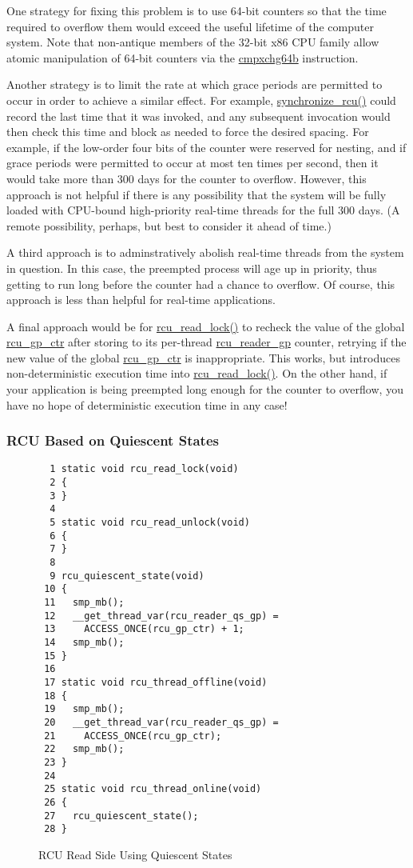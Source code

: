 {	One strategy for fixing this problem is to use 64-bit
	counters so that the time required to overflow them would exceed
	the useful lifetime of the computer system.
	Note that non-antique members of the 32-bit x86 CPU family
	allow atomic manipulation of 64-bit counters via the
	\url{cmpxchg64b} instruction.

	Another strategy is to limit the rate at which grace periods are
	permitted to occur in order to achieve a similar effect.
	For example, \url{synchronize_rcu()} could record the last time
	that it was invoked, and any subsequent invocation would then
	check this time and block as needed to force the desired
	spacing.
	For example, if the low-order four bits of the counter were
	reserved for nesting, and if grace periods were permitted to
	occur at most ten times per second, then it would take more
	than 300 days for the counter to overflow.
	However, this approach is not helpful if there is any possibility
	that the system will be fully loaded with CPU-bound high-priority
	real-time threads for the full 300 days.
	(A remote possibility, perhaps, but best to consider it ahead
	of time.)

	A third approach is to adminstratively abolish real-time threads
	from the system in question.
	In this case, the preempted process will age up in priority,
	thus getting to run long before the counter had a chance to
	overflow.
	Of course, this approach is less than helpful for real-time
	applications.

	A final approach would be for \url{rcu_read_lock()} to recheck
	the value of the global \url{rcu_gp_ctr} after storing to its
	per-thread \url{rcu_reader_gp} counter, retrying if the new
	value of the global \url{rcu_gp_ctr} is inappropriate.
	This works, but introduces non-deterministic execution time
	into \url{rcu_read_lock()}.
	On the other hand, if your application is being preempted long
	enough for the counter to overflow, you have no hope of
	deterministic execution time in any case!

} \QuickQuizEnd

\subsubsection{RCU Based on Quiescent States}
\label{defer:RCU Based on Quiescent States}

\begin{figure}[tbp]
{ \scriptsize
\begin{verbatim}
  1 static void rcu_read_lock(void)
  2 {
  3 }
  4
  5 static void rcu_read_unlock(void)
  6 {
  7 }
  8
  9 rcu_quiescent_state(void)
 10 {
 11   smp_mb();
 12   __get_thread_var(rcu_reader_qs_gp) =
 13     ACCESS_ONCE(rcu_gp_ctr) + 1;
 14   smp_mb();
 15 }
 16
 17 static void rcu_thread_offline(void)
 18 {
 19   smp_mb();
 20   __get_thread_var(rcu_reader_qs_gp) =
 21     ACCESS_ONCE(rcu_gp_ctr);
 22   smp_mb();
 23 }
 24
 25 static void rcu_thread_online(void)
 26 {
 27   rcu_quiescent_state();
 28 }
\end{verbatim}
}
\caption{RCU Read Side Using Quiescent States}
\label{fig:defer:RCU Read Side Using Quiescent States}
\end{figure}

